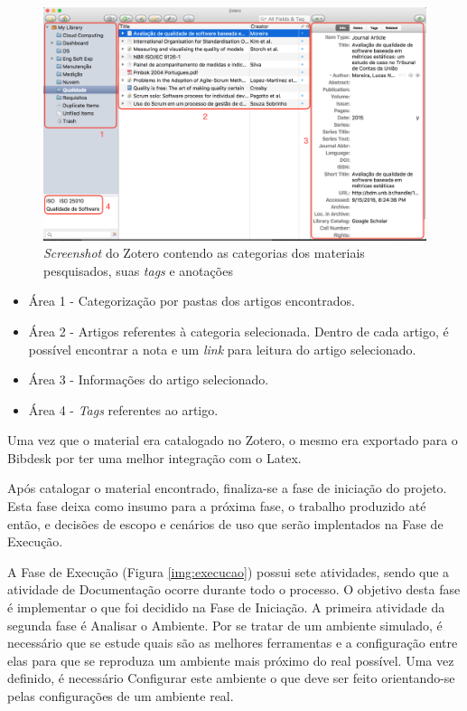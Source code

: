 \graphicspath{{figuras/}}
\begin{figure}[H]
\centering
\includegraphics[scale=0.40]{zotero_edit2.png}
\caption{\textit{Screenshot} do Zotero contendo as categorias dos materiais pesquisados, suas \textit{tags} e anotações}
\label{img:zotero}
\end{figure}

\begin{itemize}
\item Área 1 - Categorização por pastas dos artigos encontrados.
\item Área 2 - Artigos referentes à categoria selecionada. Dentro de cada artigo, é possível encontrar a nota e um \textit{link} para leitura do artigo selecionado.
\item Área 3 - Informações do artigo selecionado.
\item Área 4 - \textit{Tags} referentes ao artigo.
\end{itemize}
Uma vez que o material era catalogado no Zotero, o mesmo era exportado para o Bibdesk por ter uma melhor integração com o Latex.

Após catalogar o material encontrado, finaliza-se a fase de iniciação do projeto. Esta fase deixa como insumo para a próxima fase, o trabalho produzido até então, e decisões de escopo e cenários de uso que serão implentados na Fase de Execução. 

A Fase de Execução (Figura \ref{img:execucao}) possui sete atividades, sendo que a atividade de Documentação ocorre durante todo o processo. O objetivo desta fase é implementar o que foi decidido na Fase de Iniciação. A primeira atividade da segunda fase é Analisar o Ambiente. Por se tratar de um ambiente simulado, é necessário que se estude quais são as melhores ferramentas e a configuração entre elas para que se reproduza um ambiente mais próximo do real possível. Uma vez definido, é necessário Configurar este ambiente  o que deve ser feito orientando-se pelas configurações de um ambiente real.

